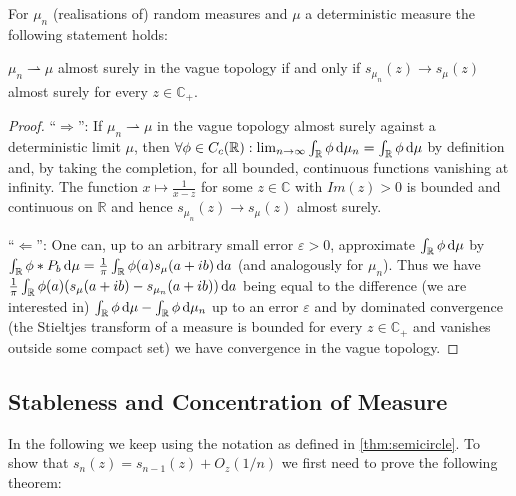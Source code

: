 \begin{theorem}
	For $\mu_n$ (realisations of) random measures and $\mu$ a deterministic measure the following statement holds:
	
	$\mu_n\rightharpoonup\mu$ almost surely in the vague topology if and only if $s_{\mu_n}(z)\rightarrow s_\mu(z)$ almost surely for every $z\in\mathbb C_+$.
\end{theorem}

\begin{proof}

	``$\Rightarrow$'': If $\mu_n\rightharpoonup\mu$ in the vague topology almost surely against a deterministic limit $\mu$, then $\forall \phi\in C_c(\mathbb R): \lim_{n\rightarrow\infty}\int_\mathbb{R}\phi \mathop{}\!\mathrm{d}\mu_n=\int_\mathbb{R}\phi \mathop{}\!\mathrm{d}\mu$ by definition and, by taking the completion, for all bounded, continuous functions vanishing at infinity. The function $x\mapsto \frac{1}{x-z}$ for some $z\in\mathbb C$ with $Im(z)>0$ is bounded and continuous on $\mathbb R$ and hence $s_{\mu_n}(z)\rightarrow s_\mu(z)$ almost surely.
	
	``$\Leftarrow$'': One can, up to an arbitrary small error $\varepsilon>0$, approximate $\int_\mathbb{R}\phi\mathop{}\!\mathrm{d}\mu$ by $\int_\mathbb{R}\phi*P_b \mathop{}\!\mathrm{d}\mu = \frac{1}{\pi}\int_\mathbb{R}\phi(a)s_\mu(a+ib)\mathop{}\!\mathrm{d} a$ (and analogously for $\mu_n$).
	Thus we have $\frac{1}{\pi}\int_\mathbb{R}\phi(a)(s_\mu(a+ib)-s_{\mu_n}(a+ib))\mathop{}\!\mathrm{d} a$ being equal to the difference (we are interested in) $\int_\mathbb{R}\phi\mathop{}\!\mathrm{d}\mu - \int_\mathbb{R}\phi\mathop{}\!\mathrm{d}\mu_n$ up to an error $\varepsilon$ and by dominated convergence (the Stieltjes transform of a measure is bounded for every $z\in \mathbb C_+$ and vanishes outside some compact set) we have convergence in the vague topology.
\end{proof}

\subsection{Stableness and Concentration of Measure}
In the following we keep using the notation as defined in \ref{thm:semicircle}. To show that $s_n(z)=s_{n-1}(z)+O_z(1/n)$ we first need to prove the following theorem:

